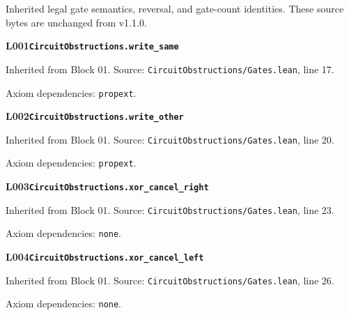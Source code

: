 Inherited legal gate semantics, reversal, and gate-count identities. These source bytes are unchanged from v1.1.0.
\par\medskip

\begin{minipage}{\linewidth}
\hypertarget{L001}{}
{\small\sffamily\bfseries\color{ink}L001\quad\nolinkurl{CircuitObstructions.write_same}}\par
{\scriptsize\sffamily\color{muted}Inherited from Block 01. Source: \nolinkurl{CircuitObstructions/Gates.lean}, line 17.}\par
{}
{\scriptsize\sffamily\color{muted}Axiom dependencies: \nolinkurl{propext}.}
\end{minipage}\par\medskip
\begin{minipage}{\linewidth}
\hypertarget{L002}{}
{\small\sffamily\bfseries\color{ink}L002\quad\nolinkurl{CircuitObstructions.write_other}}\par
{\scriptsize\sffamily\color{muted}Inherited from Block 01. Source: \nolinkurl{CircuitObstructions/Gates.lean}, line 20.}\par
{}
{\scriptsize\sffamily\color{muted}Axiom dependencies: \nolinkurl{propext}.}
\end{minipage}\par\medskip
\begin{minipage}{\linewidth}
\hypertarget{L003}{}
{\small\sffamily\bfseries\color{ink}L003\quad\nolinkurl{CircuitObstructions.xor_cancel_right}}\par
{\scriptsize\sffamily\color{muted}Inherited from Block 01. Source: \nolinkurl{CircuitObstructions/Gates.lean}, line 23.}\par
{}
{\scriptsize\sffamily\color{muted}Axiom dependencies: \nolinkurl{none}.}
\end{minipage}\par\medskip
\begin{minipage}{\linewidth}
\hypertarget{L004}{}
{\small\sffamily\bfseries\color{ink}L004\quad\nolinkurl{CircuitObstructions.xor_cancel_left}}\par
{\scriptsize\sffamily\color{muted}Inherited from Block 01. Source: \nolinkurl{CircuitObstructions/Gates.lean}, line 26.}\par
{}
{\scriptsize\sffamily\color{muted}Axiom dependencies: \nolinkurl{none}.}
\end{minipage}\par\medskip
